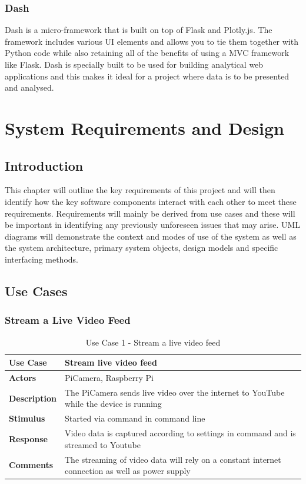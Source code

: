 \documentclass[10pt,a4paper]{article}
\begin{document}
\subsubsection{Dash\citep{website:dash}}
Dash is a micro-framework that is built on top of Flask and Plotly.js. The framework includes various UI elements and allows you to tie them together with Python code while also retaining all of the benefits of using a MVC framework like Flask. Dash is specially built to be used for building analytical web applications and this makes it ideal for a project where data is to be presented and analysed. 

\section{System Requirements and Design}
\subsection{Introduction}
This chapter will outline the key requirements of this project and will then identify how the key software components interact with each other to meet these requirements. Requirements will mainly be derived from use cases and these will be important in identifying any previously unforeseen issues that may arise. UML diagrams will demonstrate the context and modes of use of the system as well as the system architecture, primary system objects, design models and specific interfacing methods. 

\subsection{Use Cases}
\subsubsection{Stream a Live Video Feed}
\begin{table}[h!]
\centering
\begin{tabular}{p{2cm}p{9cm}}
\toprule
\textbf{Use Case}    & Stream live video feed                                                                          \\ \midrule
\textbf{Actors}      & PiCamera, Raspberry Pi                                                                          \\
\textbf{Description} & The PiCamera sends live video over the internet to YouTube while the device is running         \\
\textbf{Stimulus}    & Started via command in command line                                                             \\
\textbf{Response}    & Video data is captured according to settings in command and is streamed to Youtube              \\
\textbf{Comments}    & The streaming of video data will rely on a constant internet connection as well as power supply \\ \bottomrule
\end{tabular}
\caption{Use Case 1 - Stream a live video feed}
\label{tab:useCase1}
\end{table}
\end{document}
